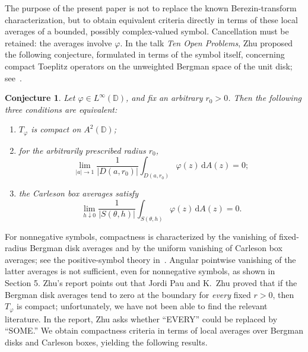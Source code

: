\documentclass[12pt,a4paper]{article}
\newtheorem*{conjecture}{Conjecture}
\theoremstyle{remark}
\newcommand{\D}{\mathbb D}
\newcommand{\dA}{\,\mathrm dA}
\newcommand{\A}{A^2(\D)}
\begin{document}
The purpose of the present paper is not to replace the known Berezin-transform characterization, but to obtain equivalent criteria directly in terms of these local averages of a bounded, possibly complex-valued symbol. Cancellation must be retained: the averages involve $\varphi$. In the talk \emph{Ten Open Problems}, Zhu proposed the following conjecture, formulated in terms of the symbol itself, concerning compact Toeplitz operators on the unweighted Bergman space of the unit disk; see~\cite{ZhuSlides}.
\begin{conjecture}
Let $\varphi\in L^\infty(\D)$, and fix an arbitrary $r_0>0$.
Then the following three conditions are equivalent:
\begin{enumerate}[label=\textnormal{(C\arabic*)}]
\item $T_\varphi$ is compact on $\A$;
\item for the \emph{arbitrarily prescribed radius} $r_0$,
\begin{equation}\label{eq:conj-disk}
\lim_{|a|\to1}\frac1{|D(a,r_0)|}
\int_{D(a,r_0)}\varphi(z)\dA(z)=0;
\end{equation}
\item the Carleson box averages satisfy
\begin{equation}\label{eq:conj-box}
\lim_{h\downarrow0}
\frac1{|S(\theta,h)|}\int_{S(\theta,h)}\varphi(z)\dA(z)=0.
\end{equation}
\end{enumerate}
\end{conjecture}
For nonnegative symbols, compactness is characterized by the vanishing of fixed-radius Bergman disk averages and by the uniform vanishing of Carleson box averages; see the positive-symbol theory in~\cite{HKZ2000,Zhu1988,Zhu2007}. Angular pointwise vanishing of the latter averages is not sufficient, even for nonnegative symbols, as shown in Section 5. Zhu's report points out that Jordi Pau and K.~Zhu proved that if the Bergman disk averages tend to zero at the boundary for \emph{every} fixed $r>0$, then $T_\varphi$ is compact; unfortunately, we have not been able to find the relevant literature. In the report,  Zhu asks whether ``EVERY'' could be replaced by ``SOME.'' We obtain compactness criteria in terms of local averages over Bergman disks and Carleson boxes, yielding the following results.
\end{document}
